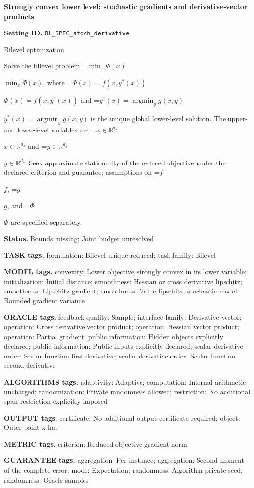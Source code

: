 \documentclass[10pt,a4paper]{article}
\newcommand{\AtlasMath}[1]{\par\begingroup\centering\setbox0=\hbox{$\displaystyle #1$}\ifdim\wd0>1.4\linewidth\typeout{ATLAS WIDE FORMULA: \the\wd0}\fi\ifdim\wd0>\linewidth\resizebox{\linewidth}{!}{\box0}\else\box0\fi\par\endgroup}
\newcommand{\AtlasInlineMath}[1]{\begingroup\setbox0=\hbox{$#1$}\ifdim\wd0>.4\linewidth\endgroup\AtlasMath{#1}\else\endgroup$#1$\fi}
\begin{document}
\raggedright

{\LARGE\bfseries\sffamily\color{AtlasNavy} Strongly convex lower level: stochastic gradients and derivative-vector products\par}\vspace{5pt}
\textbf{Setting ID.} \texttt{BL\_\allowbreak{}SPEC\_\allowbreak{}stoch\_\allowbreak{}derivative}

Bilevel optimization

Solve the bilevel problem \AtlasInlineMath{\min_x\Phi(x)}, where \AtlasInlineMath{\Phi(x)=f(x,y^*(x))} and \AtlasInlineMath{y^*(x)=\operatorname*{argmin}_y g(x,y)} is the unique global lower-level solution. The upper- and lower-level variables are \AtlasInlineMath{x\in\mathbb{R}^{d_x}} and \AtlasInlineMath{y\in\mathbb{R}^{d_y}}. Seek approximate stationarity of the reduced objective under the declared criterion and guarantee; assumptions on \AtlasInlineMath{f}, \AtlasInlineMath{g}, and \AtlasInlineMath{\Phi} are specified separately.

\textbf{Status.} Bounds missing; Joint budget unresolved

\textbf{TASK tags.} formulation: Bilevel unique reduced; task family: Bilevel

\textbf{MODEL tags.} convexity: Lower objective strongly convex in its lower variable; initialization: Initial distance; smoothness: Hessian or cross derivative lipschitz; smoothness: Lipschitz gradient; smoothness: Value lipschitz; stochastic model: Bounded gradient variance

\textbf{ORACLE tags.} feedback quality: Sample; interface family: Derivative vector; operation: Cross derivative vector product; operation: Hessian vector product; operation: Partial gradient; public information: Hidden objects explicitly declared; public information: Public inputs explicitly declared; scalar derivative order: Scalar-function first derivative; scalar derivative order: Scalar-function second derivative

\textbf{ALGORITHMS tags.} adaptivity: Adaptive; computation: Internal arithmetic uncharged; randomization: Private randomness allowed; restriction: No additional span restriction explicitly imposed

\textbf{OUTPUT tags.} certificate: No additional output certificate required; object: Outer point x hat

\textbf{METRIC tags.} criterion: Reduced-objective gradient norm

\textbf{GUARANTEE tags.} aggregation: Per instance; aggregation: Second moment of the complete error; mode: Expectation; randomness: Algorithm private seed; randomness: Oracle samples
\end{document}
